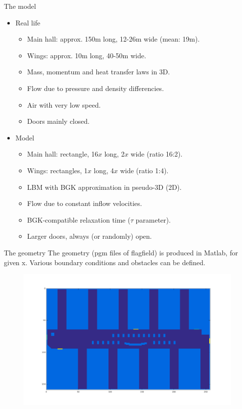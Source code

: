 \documentclass[9pt,pdftex]{beamer}
\begin{document}
\begin{frame}{The model}
 \begin{itemize}
  \item Real life
  \begin{itemize}
   \item Main hall: approx. 150m long, 12-26m wide (mean: 19m).
   \item Wings: approx. 10m long, 40-50m wide.
   \item Mass, momentum and heat transfer laws in 3D.
   \item Flow due to pressure and density differencies.
   \item Air with very low speed.
   \item Doors mainly closed.
  \end{itemize}
  
  \pause
  
  \item Model
  \begin{itemize}
   \item Main hall: rectangle, 16$x$ long, 2$x$ wide (ratio 16:2).
   \item Wings: rectangles, 1$x$ long, 4$x$ wide (ratio 1:4).
   \item LBM with BGK approximation in pseudo-3D (2D).
   \item Flow due to constant inflow velocities.
   \item BGK-compatible relaxation time ($\tau$ parameter).
   \item Larger doors, always (or randomly) open.
  \end{itemize}

 \end{itemize}
\end{frame}

\begin{frame}{The geometry}
The geometry (pgm files of flagfield) is produced in Matlab, for given x.
Various boundary conditions and obstacles can be defined.
 \begin{figure}
  \includegraphics[width=0.8\linewidth]{matlab_whole_domain}
 \end{figure}
\end{frame}
\end{document}
